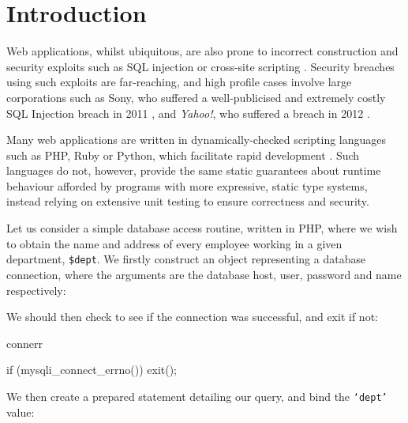 \section{Introduction}

Web applications, whilst ubiquitous, are also prone to incorrect construction
and security exploits such as SQL injection \cite{owasp:sqli} or cross-site
scripting \cite{owasp:xss}. Security breaches using such exploits are
far-reaching, and high profile cases involve large corporations such as Sony,
who suffered a well-publicised and extremely costly SQL Injection breach in
2011 \cite{ieee:sony}, and \textit{Yahoo!}, who suffered a breach in 2012
\cite{imperva:yahoo}. 

Many web applications are written in dynamically-checked scripting languages
such as PHP, Ruby or Python, which facilitate rapid development
\cite{w3techs:webpls}. Such languages do not, however, provide the same static 
guarantees about runtime behaviour afforded by
programs with more expressive, static type systems, instead relying on
extensive unit testing to ensure correctness and security. 

Let us consider a simple database access routine, written in
PHP, where we wish to obtain the name and address of every employee working in
a given department, \texttt{\$dept}. We firstly construct an object
representing a database connection, where the arguments are the database host,
user, password and name respectively:


\noindent
We should then check to see if the connection was successful, and exit
if not:

\begin{SaveVerbatim}{connerr}

if (mysqli_connect_errno()) { exit(); }

\end{SaveVerbatim}

\noindent
We then create a prepared statement detailing our query, and bind the
\texttt{`dept'} value:

